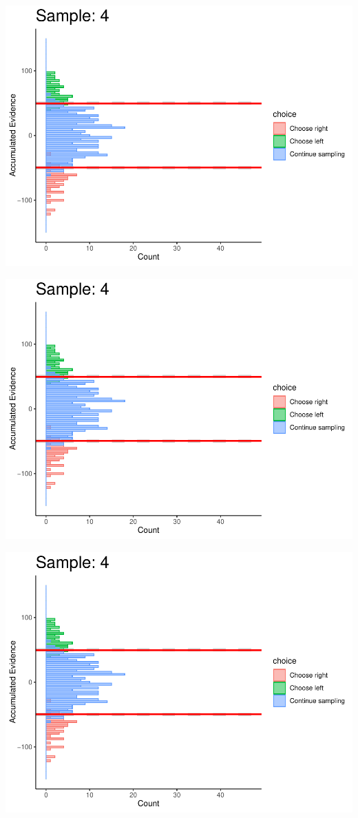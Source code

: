 \documentclass[
]{book}
\begin{document}
\begin{center}\includegraphics[width=0.8\linewidth]{LateNightBayes_files/figure-latex/fixed_dcb-34} \end{center}

\begin{center}\includegraphics[width=0.8\linewidth]{LateNightBayes_files/figure-latex/fixed_dcb-35} \end{center}

\begin{center}\includegraphics[width=0.8\linewidth]{LateNightBayes_files/figure-latex/fixed_dcb-36} \end{center}
\end{document}
